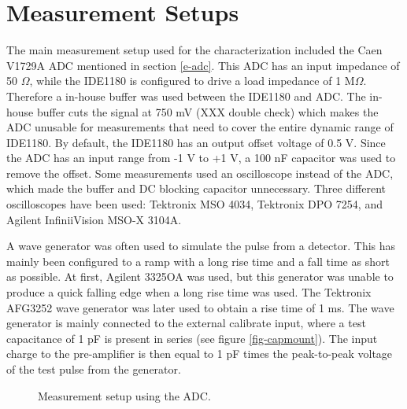 \documentclass[../main/thesis.tex]{subfiles}
\begin{document}
\section{Measurement Setups}
\label{ide-setup}

The main measurement setup used for the characterization included the Caen V1729A \gls{ADC} mentioned in section \ref{e-adc}. This \gls{ADC} has an input impedance of 50 $\Omega$, while the IDE1180 is configured to drive a load impedance of 1 M$\Omega$. Therefore a in-house buffer was used between the IDE1180 and ADC. The in-house buffer cuts the signal at 750 mV (XXX double check) which makes the \gls{ADC} unusable for measurements that need to cover the entire dynamic range of IDE1180. By default, the IDE1180 has an output offset voltage of 0.5 V. Since the ADC has an input range from -1 V to +1 V, a 100 nF capacitor was used to remove the offset. Some measurements used an oscilloscope instead of the ADC, which made the buffer and DC blocking capacitor unnecessary. Three different oscilloscopes have been used: Tektronix MSO 4034, Tektronix DPO 7254, and Agilent InfiniiVision MSO-X 3104A. 

A wave generator was often used to simulate the pulse from a detector. This has mainly been configured to a ramp with a long rise time and a fall time as short as possible. At first, Agilent 3325OA was used, but this generator was unable to produce a quick falling edge when a long rise time was used. The Tektronix AFG3252 wave generator was later used to obtain a rise time of 1 ms. The wave generator is mainly connected to the external calibrate input, where a test capacitance of 1 pF is present in series (see figure \ref{fig-capmount}). The input charge to the pre-amplifier is then equal to 1 pF times the peak-to-peak voltage of the test pulse from the generator. 

\begin{figure}
\centering
{}
\caption{Measurement setup using the ADC.}
\label{fig-setup-adc}
\end{figure}
\end{document}
